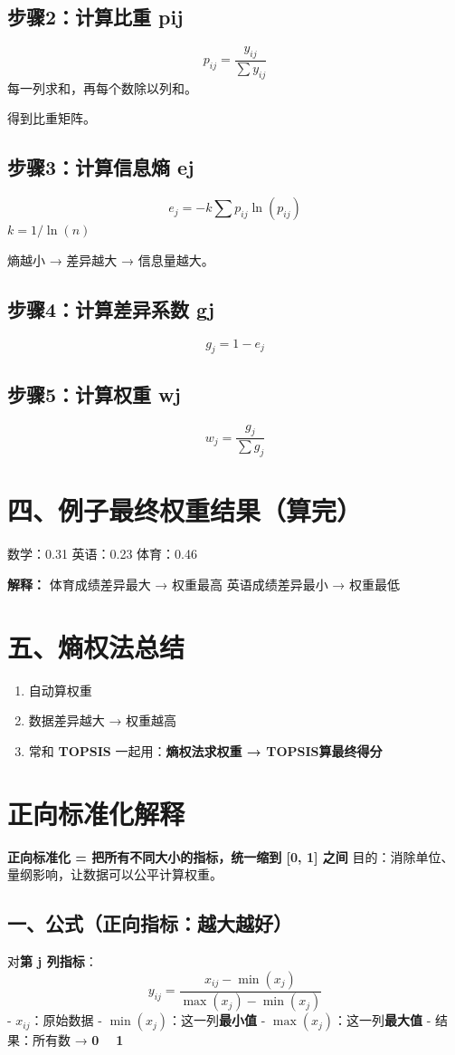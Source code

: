 \documentclass{article}
\begin{document}
\subsection{步骤2：计算比重 pij}
\[ p_{ij}=\frac{y_{ij}}{\sum y_{ij}} \]
每一列求和，再每个数除以列和。

得到比重矩阵。

\subsection{步骤3：计算信息熵 ej}
\[ e_j = -k \sum p_{ij}\ln(p_{ij}) \]
$k=1/\ln(n)$

熵越小 → 差异越大 → 信息量越大。

\subsection{步骤4：计算差异系数 gj}
\[ g_j = 1 - e_j \]

\subsection{步骤5：计算权重 wj}
\[ w_j = \frac{g_j}{\sum g_j} \]

\section{四、例子最终权重结果（算完）}
数学：0.31
英语：0.23
体育：0.46

\textbf{解释：}
体育成绩差异最大 → 权重最高
英语成绩差异最小 → 权重最低

\section{五、熵权法总结}
\begin{enumerate}
    \item 自动算权重
    \item 数据差异越大 → 权重越高
    \item 常和 \textbf{TOPSIS} 一起用：\textbf{熵权法求权重 → TOPSIS算最终得分}
\end{enumerate}

\section{正向标准化解释}
\textbf{正向标准化 = 把所有不同大小的指标，统一缩到 [0, 1] 之间}
目的：消除单位、量纲影响，让数据可以公平计算权重。

\subsection{一、公式（正向指标：越大越好）}
对\textbf{第 j 列指标}：
\[ y_{ij} = \frac{x_{ij} - \min(x_j)}{\max(x_j) - \min(x_j)} \]
- $x_{ij}$：原始数据
- $\min(x_j)$：这一列\textbf{最小值}
- $\max(x_j)$：这一列\textbf{最大值}
- 结果：所有数 → \textbf{0 ~ 1}
\end{document}
